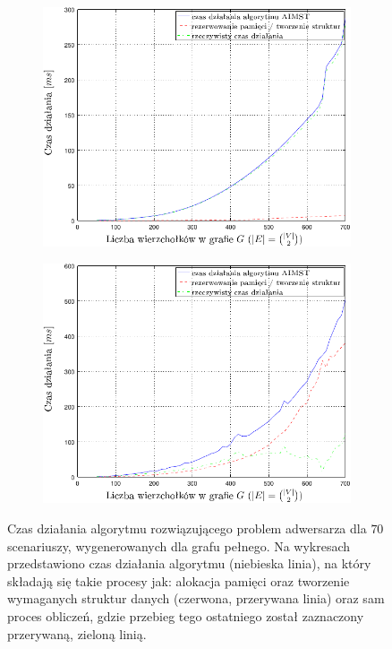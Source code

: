 \begin{figure}[!htbp]
	\ContinuedFloat
	\null\hfill
	\begin{subfigure}[b]{0.45\textwidth}
		\includegraphics[width=\textwidth]{Chapter_VI/AIMST1-example/AIMST1_psfrag}
		\caption{}
		\label{fig:aimst1:a}
	\end{subfigure}
	\hfill
	\begin{subfigure}[b]{0.45\textwidth}
		\includegraphics[width=\textwidth]{Chapter_VI/AIMST2-example/AIMST2_psfrag}
		\caption{}
		\label{fig:aimst1:b}
	\end{subfigure}
	\hfill\null
	\caption{
		Czas działania algorytmu rozwiązującego problem adwersarza dla $70$ scenariuszy, wygenerowanych dla grafu pełnego. Na wykresach przedstawiono czas działania algorytmu (niebieska linia), na który składają się takie procesy jak: alokacja pamięci oraz tworzenie wymaganych struktur danych (czerwona, przerywana linia) oraz sam proces obliczeń, gdzie przebieg tego ostatniego został zaznaczony przerywaną, zieloną linią.
}
\end{figure}
